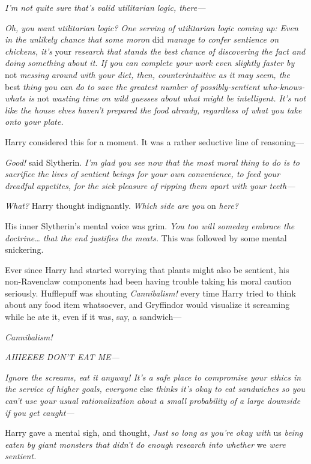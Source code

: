 \emph{I'm not quite sure that's valid utilitarian logic, there---}

\emph{Oh, you want utilitarian logic? One serving of utilitarian logic coming 
up: Even in the unlikely chance that some moron} did \emph{manage to confer 
sentience on chickens, it's} your \emph{research that stands the best chance of 
discovering the fact and doing something about it. If you can complete your 
work even slightly faster by} not \emph{messing around with your diet, then, 
counterintuitive as it may seem, the} best \emph{thing you can do to save the 
greatest number of possibly-sentient who-knows-whats is} not \emph{wasting time 
on wild guesses about what might be intelligent. It's not like the house elves 
haven't prepared the food already, regardless of what you take onto your plate.}

Harry considered this for a moment. It was a rather seductive line of 
reasoning---

\emph{Good!} said Slytherin. \emph{I'm glad you see now that the most moral 
thing to do is to sacrifice the lives of sentient beings for your own 
convenience, to feed your dreadful appetites, for the sick pleasure of ripping 
them apart with your teeth---}

\emph{What?} Harry thought indignantly. \emph{Which side are you} on \emph{
here?}

His inner Slytherin's mental voice was grim. \emph{You too will someday embrace 
the doctrine{\ldots} that the end justifies the meats.} This was followed by 
some mental snickering.

Ever since Harry had started worrying that plants might also be sentient, his 
non-Ravenclaw components had been having trouble taking his moral caution 
seriously. Hufflepuff was shouting \emph{Cannibalism!} every time Harry tried 
to think about any food item whatsoever, and Gryffindor would visualize it 
screaming while he ate it, even if it was, say, a sandwich---

\emph{Cannibalism!}

\emph{AIIIEEEE DON'T EAT ME---}

\emph{Ignore the screams, eat it anyway! It's a safe place to compromise your 
ethics in the service of higher goals, everyone} else \emph{thinks it's okay to 
eat sandwiches so you can't use your usual rationalization about a small 
probability of a large downside if you get caught---}

Harry gave a mental sigh, and thought, \emph{Just so long as you're okay with} 
us \emph{being eaten by giant monsters that didn't do enough research into 
whether} we \emph{were sentient.}

